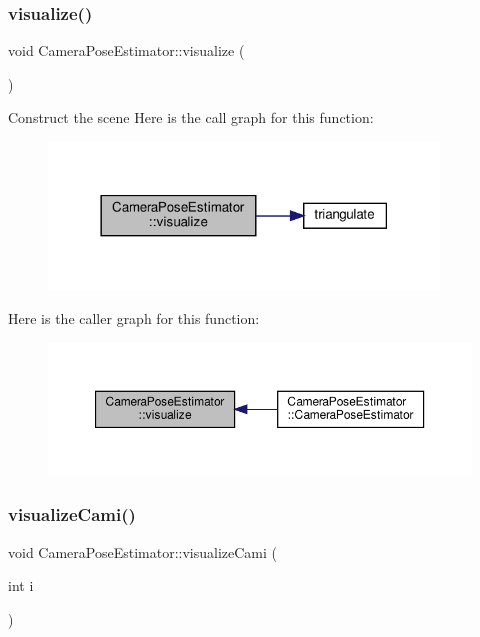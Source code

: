 \subsubsection{\texorpdfstring{visualize()}{visualize()}}
{\footnotesize\ttfamily void Camera\+Pose\+Estimator\+::visualize (\begin{DoxyParamCaption}{ }\end{DoxyParamCaption})}

Construct the scene Here is the call graph for this function\+:\nopagebreak
\begin{figure}[H]
\begin{center}
\leavevmode
\includegraphics[width=294pt]{classCameraPoseEstimator_ac1b95d78d7d3f4c8032d8e494034420c_cgraph}
\end{center}
\end{figure}
Here is the caller graph for this function\+:\nopagebreak
\begin{figure}[H]
\begin{center}
\leavevmode
\includegraphics[width=350pt]{classCameraPoseEstimator_ac1b95d78d7d3f4c8032d8e494034420c_icgraph}
\end{center}
\end{figure}
\mbox{\label{classCameraPoseEstimator_a77d2c2226c4f11ec9e65f3552086abff}} 
\subsubsection{\texorpdfstring{visualize\+Cami()}{visualizeCami()}}
{\footnotesize\ttfamily void Camera\+Pose\+Estimator\+::visualize\+Cami (\begin{DoxyParamCaption}\item[{int}]{i }\end{DoxyParamCaption})}

